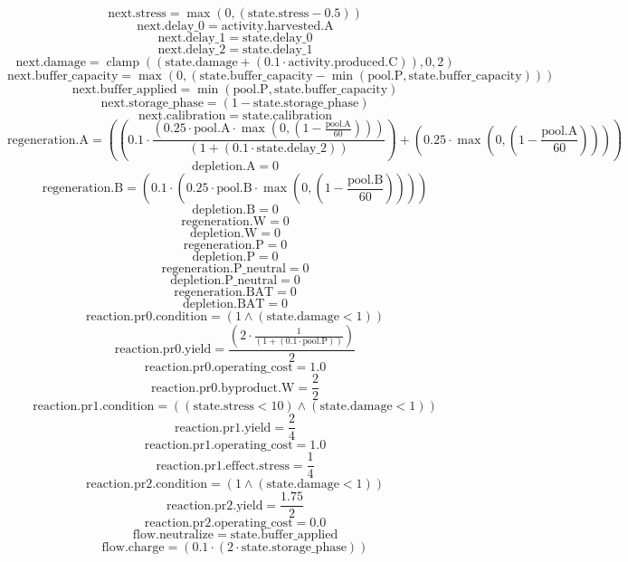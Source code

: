 \[\mathrm{next.stress}=\operatorname{max}\left(0,\left(\mathrm{state.stress} - 0.5\right)\right)\]
\[\mathrm{next.delay\_0}=\mathrm{activity.harvested.A}\]
\[\mathrm{next.delay\_1}=\mathrm{state.delay\_0}\]
\[\mathrm{next.delay\_2}=\mathrm{state.delay\_1}\]
\[\mathrm{next.damage}=\operatorname{clamp}\left(\left(\mathrm{state.damage} + \left(0.1 \cdot \mathrm{activity.produced.C}\right)\right),0,2\right)\]
\[\mathrm{next.buffer\_capacity}=\operatorname{max}\left(0,\left(\mathrm{state.buffer\_capacity} - \operatorname{min}\left(\mathrm{pool.P},\mathrm{state.buffer\_capacity}\right)\right)\right)\]
\[\mathrm{next.buffer\_applied}=\operatorname{min}\left(\mathrm{pool.P},\mathrm{state.buffer\_capacity}\right)\]
\[\mathrm{next.storage\_phase}=\left(1 - \mathrm{state.storage\_phase}\right)\]
\[\mathrm{next.calibration}=\mathrm{state.calibration}\]
\[\mathrm{regeneration.A}=\left(\left(0.1 \cdot \frac{\left(0.25 \cdot \mathrm{pool.A} \cdot \operatorname{max}\left(0,\left(1 - \frac{\mathrm{pool.A}}{60}\right)\right)\right)}{\left(1 + \left(0.1 \cdot \mathrm{state.delay\_2}\right)\right)}\right) + \left(0.25 \cdot \operatorname{max}\left(0,\left(1 - \frac{\mathrm{pool.A}}{60}\right)\right)\right)\right)\]
\[\mathrm{depletion.A}=0\]
\[\mathrm{regeneration.B}=\left(0.1 \cdot \left(0.25 \cdot \mathrm{pool.B} \cdot \operatorname{max}\left(0,\left(1 - \frac{\mathrm{pool.B}}{60}\right)\right)\right)\right)\]
\[\mathrm{depletion.B}=0\]
\[\mathrm{regeneration.W}=0\]
\[\mathrm{depletion.W}=0\]
\[\mathrm{regeneration.P}=0\]
\[\mathrm{depletion.P}=0\]
\[\mathrm{regeneration.P\_neutral}=0\]
\[\mathrm{depletion.P\_neutral}=0\]
\[\mathrm{regeneration.BAT}=0\]
\[\mathrm{depletion.BAT}=0\]
\[\mathrm{reaction.pr0.condition}=\left(1 \land \left(\mathrm{state.damage} < 1\right)\right)\]
\[\mathrm{reaction.pr0.yield}=\frac{\left(2 \cdot \frac{1}{\left(1 + \left(0.1 \cdot \mathrm{pool.P}\right)\right)}\right)}{2}\]
\[\mathrm{reaction.pr0.operating\_cost}=1.0\]
\[\mathrm{reaction.pr0.byproduct.W}=\frac{2}{2}\]
\[\mathrm{reaction.pr1.condition}=\left(\left(\mathrm{state.stress} < 10\right) \land \left(\mathrm{state.damage} < 1\right)\right)\]
\[\mathrm{reaction.pr1.yield}=\frac{2}{4}\]
\[\mathrm{reaction.pr1.operating\_cost}=1.0\]
\[\mathrm{reaction.pr1.effect.stress}=\frac{1}{4}\]
\[\mathrm{reaction.pr2.condition}=\left(1 \land \left(\mathrm{state.damage} < 1\right)\right)\]
\[\mathrm{reaction.pr2.yield}=\frac{1.75}{2}\]
\[\mathrm{reaction.pr2.operating\_cost}=0.0\]
\[\mathrm{flow.neutralize}=\mathrm{state.buffer\_applied}\]
\[\mathrm{flow.charge}=\left(0.1 \cdot \left(2 \cdot \mathrm{state.storage\_phase}\right)\right)\]
